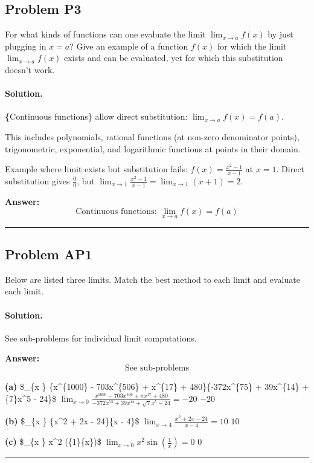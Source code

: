 \documentclass[12pt, a4paper]{article}
\newcommand{\problem}[1]{\subsection*{Problem #1}}
\newcommand{\solution}{\paragraph{Solution.}}
\begin{document}
\problem{P3}

For what kinds of functions can one evaluate the limit $\lim_{x \to a} f(x)$ by just plugging in $x = a$? Give an example of a function $f(x)$ for which the limit $\lim_{x \to a} f(x)$ exists and can be evaluated, yet for which this substitution doesn't work.

\solution

\textbf\{Continuous functions\} allow direct substitution: $\lim_{x \to a} f(x) = f(a)$.

This includes polynomials, rational functions (at non-zero denominator points), trigonometric, exponential, and logarithmic functions at points in their domain.

Example where limit exists but substitution fails: $f(x) = \frac{x^2 - 1}{x - 1}$ at $x = 1$. Direct substitution gives $\frac{0}{0}$, but $\lim_{x \to 1} \frac{x^2-1}{x-1} = \lim_{x \to 1}(x+1) = 2$.

\textbf{Answer:}
\[\text{Continuous functions: } \lim_{x \to a} f(x) = f(a)\]

\vspace{1em}
\hrule
\vspace{1em}

\problem{AP1}

Below are listed three limits. Match the best method to each limit and evaluate each limit.

\solution

See sub-problems for individual limit computations.

\textbf{Answer:}
\[\text{See sub-problems}\]

\textbf{(a)}
\$\lim\_\{x \} \frac\{x\textasciicircum{}\{1000\} - 703x\textasciicircum{}\{506\} + \pi x\textasciicircum{}\{17\} + 480\}\{-372x\textasciicircum{}\{75\} + 39x\textasciicircum{}\{14\} + \sqrt\{7\}x\textasciicircum{}5 - 24\}\$
$\lim_{x \to 0} \frac{x^{1000} - 703 x^{506} + \pi x^{17} + 480}{- 372 x^{75} + 39 x^{14} + \sqrt{7} x^{5} - 24} = -20$
$\boxed{-20}$

\textbf{(b)}
\$\lim\_\{x \} \frac\{x\textasciicircum{}2 + 2x - 24\}\{x - 4\}\$
$\lim_{x \to 4} \frac{x^{2} + 2 x - 24}{x - 4} = 10$
$\boxed{10}$

\textbf{(c)}
\$\lim\_\{x \} x\textasciicircum{}2 \sin(\frac\{1\}\{x\})\$
$\lim_{x \to 0} x^{2} \sin{\left(\frac{1}{x} \right)} = 0$
$\boxed{0}$

\vspace{1em}
\hrule
\vspace{1em}
\end{document}
